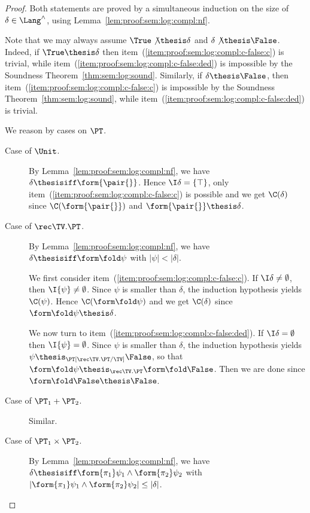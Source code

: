 \begin{proof}
Both statements are proved by a simultaneous induction on the 
size of $\delta \in \Lang^\land$,
using Lemma~\ref{lem:proof:sem:log:compl:nf}.

Note that we may always assume $\True \not\thesis \delta$
and $\delta \not\thesis \False$.
Indeed, if $\True \thesis \delta$ then
item~(\ref{item:proof:sem:log:compl:c-false:c}) is trivial,
while 
item~(\ref{item:proof:sem:log:compl:c-false:ded})
is impossible by the Soundness Theorem~\ref{thm:sem:log:sound}.
Similarly, if $\delta \thesis \False$,
then
item~(\ref{item:proof:sem:log:compl:c-false:c})
is impossible by the Soundness Theorem~\ref{thm:sem:log:sound},
while 
item~(\ref{item:proof:sem:log:compl:c-false:ded})
is trivial.

We reason by cases on $\PT$.
\begin{description}
\item[Case of $\Unit$.]
By Lemma~\ref{lem:proof:sem:log:compl:nf},
we have $\delta \thesisiff \form{\pair{}}$.
Hence $\I\delta = \{\top\}$,
only item~(\ref{item:proof:sem:log:compl:c-false:c})
is possible
and we get $\C(\delta)$ since $\C(\form{\pair{}})$ and $\form{\pair{}} \thesis \delta$.

\item[Case of $\rec\TV.\PT$.]
By Lemma~\ref{lem:proof:sem:log:compl:nf},
we have $\delta \thesisiff \form\fold\psi$
with $|\psi| < |\delta|$.

We first consider item~(\ref{item:proof:sem:log:compl:c-false:c}).
If $\I\delta \neq \emptyset$,
then $\I{\psi} \neq \emptyset$.
Since
$\psi$ is smaller than $\delta$,
the induction hypothesis
yields $\C(\psi)$.
Hence $\C(\form\fold \psi)$
and we get $\C(\delta)$ since $\form\fold \psi \thesis \delta$.

We now turn to item~(\ref{item:proof:sem:log:compl:c-false:ded}).
If $\I\delta = \emptyset$ then
$\I{\psi} = \emptyset$.
Since $\psi$ is smaller than $\delta$,
the induction hypothesis yields
$\psi \thesis_{\PT[\rec\TV.\PT/\TV]} \False$,
so that
$\form\fold\psi \thesis_{\rec\TV.\PT} \form\fold \False$.
Then we are done since $\form\fold \False \thesis \False$.

\item[Case of $\PT_1 + \PT_2$.]
Similar.

\item[Case of $\PT_1 \times \PT_2$.]
By Lemma~\ref{lem:proof:sem:log:compl:nf},
we have
$\delta \thesisiff \form{\pi_1}\psi_1 \land \form{\pi_2}\psi_2$
with
\(
  |\form{\pi_1}\psi_1 \land \form{\pi_2}\psi_2| \leq |\delta|
\).


\end{description}
\end{proof}

